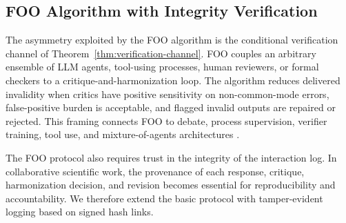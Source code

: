 \documentclass[12pt]{article}
\theoremstyle{definition}
\begin{document}
\subsection{FOO Algorithm with Integrity Verification}\label{sec:foo-algorithm}
The asymmetry exploited by the FOO algorithm is the conditional verification
channel of Theorem~\ref{thm:verification-channel}.  FOO couples an arbitrary
ensemble of LLM agents, tool-using processes, human reviewers, or formal
checkers to a critique-and-harmonization loop.  The algorithm reduces delivered
invalidity when critics have positive sensitivity on non-common-mode errors,
false-positive burden is acceptable, and flagged invalid outputs are repaired or
rejected.  This framing connects FOO to debate, process supervision, verifier
training, tool use, and mixture-of-agents architectures
\parencite{irving2018debate,du2023multiagentdebate,cobbe2021trainingverifiers,lightman2023verify,schick2023toolformer,wang2024moa}.

The FOO protocol also requires trust in the integrity of the interaction log. In
collaborative scientific work, the provenance of each response, critique,
harmonization decision, and revision becomes essential for reproducibility and
accountability.  We therefore extend the basic protocol with tamper-evident
logging based on signed hash links.

\end{document}
